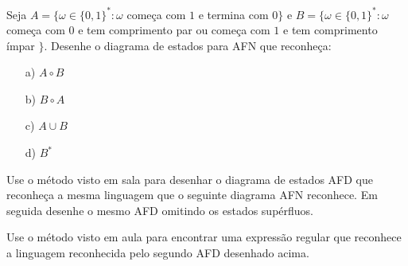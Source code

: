 \begin{exercicio}
  Seja $A = \{\omega \in \{0,1\}^* : \omega$ começa com $1$ e termina com $0 \}$ e $B = \{\omega \in \{0,1\}^* : \omega$ começa com $0$ e tem comprimento par ou começa com $1$ e tem comprimento ímpar $\}$. Desenhe o diagrama de estados para AFN que reconheça:
\begin{itemize}
\item[a)] $A \circ B$
\item[b)] $B \circ A$
\item[c)] $A \cup B$
\item[d)] $B^*$
\end{itemize}
\end{exercicio}


\begin{exercicio}
  Use o método visto em sala para desenhar o diagrama de estados AFD que reconheça a mesma linguagem que o seguinte diagrama AFN reconhece. Em seguida desenhe o mesmo AFD omitindo os estados supérfluos.

\begin{figure}[htp]
  \centering
\end{figure}


\end{exercicio}

\begin{exercicio}
Use o método visto em aula para encontrar uma expressão regular que reconhece a linguagem reconhecida pelo segundo AFD desenhado acima.
\end{exercicio}

\newpage

